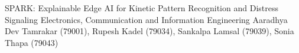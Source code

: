 \CertificateHeader  %

\ProjectCertificate
{SPARK: Explainable Edge AI for Kinetic Pattern Recognition and Distress Signaling} %
{Electronics, Communication and Information Engineering} %
{Aaradhya Dev Tamrakar (79001), Rupesh Kadel (79034), Sankalpa Lamsal (79039), Sonia Thapa (79043)} %

\vspace{2cm}  %

\vfill
\noindent
\begin{minipage}[t]{0.45\textwidth}
\end{minipage}
\hfill
\begin{minipage}[t]{0.45\textwidth}
\end{minipage}
\vspace{12mm}

